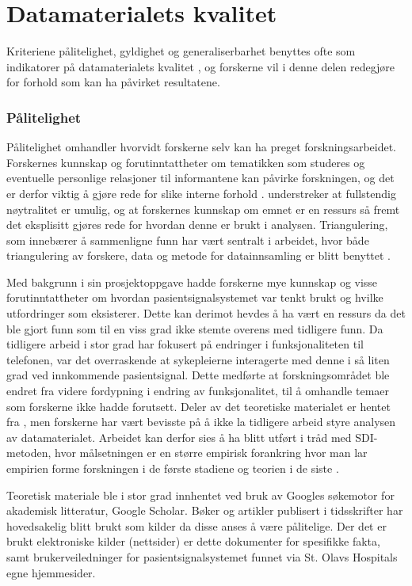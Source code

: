 \section{Datamaterialets kvalitet}
\label{kvalitativ_analyse}
Kriteriene pålitelighet, gyldighet og generaliserbarhet benyttes ofte som indikatorer på datamaterialets kvalitet \citep{Tjora}, og forskerne vil i denne delen redegjøre for forhold som kan ha påvirket resultatene. 

\subsubsection{Pålitelighet}
Pålitelighet omhandler hvorvidt forskerne selv kan ha preget forskningsarbeidet. Forskernes kunnskap og forutinntattheter om tematikken som studeres og eventuelle personlige relasjoner til informantene kan påvirke forskningen, og det er derfor viktig å gjøre rede for slike interne forhold \citep{Tjora}. \citet{Tjora} understreker at fullstendig nøytralitet er umulig, og at forskernes kunnskap om emnet er en ressurs så fremt det eksplisitt gjøres rede for hvordan denne er brukt i analysen. Triangulering, som innebærer å sammenligne funn har vært sentralt i arbeidet, hvor både triangulering av forskere, data og metode for datainnsamling er blitt benyttet \citep{Oates}. 

\noindent
Med bakgrunn i sin prosjektoppgave \citep{Sund13} hadde forskerne mye kunnskap og visse forutinntattheter om hvordan pasientsignalsystemet var tenkt brukt og hvilke utfordringer som eksisterer. Dette kan derimot hevdes å ha vært en ressurs da det ble gjort funn som til en viss grad ikke stemte overens med tidligere funn. Da tidligere arbeid i stor grad har fokusert på endringer i funksjonaliteten til telefonen, var det overraskende at sykepleierne interagerte med denne i så liten grad ved innkommende pasientsignal. Dette medførte at forskningsområdet ble endret fra videre fordypning i endring av funksjonalitet, til å omhandle temaer som forskerne ikke hadde forutsett. Deler av det teoretiske materialet er hentet fra \citep{Sund13}, men forskerne har vært bevisste på å ikke la tidligere arbeid styre analysen av datamaterialet. Arbeidet kan derfor sies å ha blitt utført i tråd med SDI-metoden, hvor målsetningen er en større empirisk forankring hvor man lar empirien forme forskningen i de første stadiene og teorien i de siste \citep{Tjora}. 

\noindent
Teoretisk materiale ble i stor grad innhentet ved bruk av Googles søkemotor for akademisk litteratur, Google Scholar. Bøker og artikler publisert i tidsskrifter har hovedsakelig blitt brukt som kilder da disse anses å være pålitelige. Der det er brukt elektroniske kilder (nettsider) er dette dokumenter for spesifikke fakta, samt brukerveiledninger for pasientsignalsystemet funnet via St. Olavs Hospitals egne hjemmesider.

